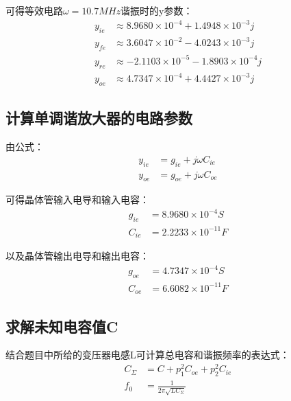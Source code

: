 \documentclass[a4paper]{ctexrep}
\begin{document}
\begin{spacing}{1.5}
可得等效电路$\omega=10.7MHz$谐振时的y参数：
\begin{equation}
\begin{split}
y_{ie}&\approx 8.9680\times 10^{-4}+1.4948\times 10^{-3}j\\
y_{fe}&\approx 3.6047\times 10^{-2}-4.0243\times 10^{-3}j\\
y_{re}&\approx -2.1103\times 10^{-5}-1.8903\times 10^{-4}j\\
y_{oe}&\approx 4.7347\times 10^{-4}+4.4427\times 10^{-3}j
\end{split}
\end{equation}

\subsection{计算单调谐放大器的电路参数}

由公式：
\begin{equation}
\begin{split}
y_{ie}&=g_{ie}+j\omega C_{ie}\\
y_{oe}&=g_{oe}+j\omega C_{oe}
\end{split}
\end{equation}

可得晶体管输入电导和输入电容：
\begin{equation}
\begin{split}
g_{ie}&=8.9680\times 10^{-4}S\\
C_{ie}&=2.2233\times 10^{-11}F
\end{split}
\end{equation}

以及晶体管输出电导和输出电容：
\begin{equation}
\begin{split}
g_{oe}&=4.7347\times 10^{-4}S\\
C_{oe}&=6.6082\times 10^{-11}F
\end{split}
\end{equation}

\subsection{求解未知电容值C}

结合题目中所给的变压器电感L可计算总电容和谐振频率的表达式：
\begin{equation}
\begin{split}
C_{\Sigma}&=C+p_{1}^{2}C_{oe}+p_{2}^{2}C_{ie}\\
f_{0}&=\frac{1}{2\pi\sqrt{LC_{\Sigma}}}
\end{split}
\end{equation}


\end{spacing}
\end{document}
